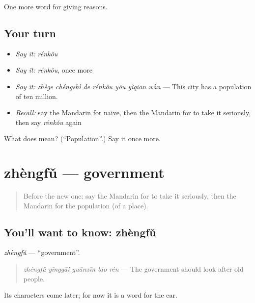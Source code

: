 \begin{grammarlens}[title={What you've built}]
One more word for giving reasons.
\end{grammarlens}

\subsection*{Your turn}
\begin{itemize}
\raggedright
  \item \emph{Say it:} \emph{rénkǒu}
  \item \emph{Say it:} \emph{rénkǒu}, once more
  \item \emph{Say it:} \emph{zhège chéngshì de rénkǒu yǒu yìqiān wàn} — This city has a population of ten million.
  \item \emph{Recall:} say the Mandarin for naive, then the Mandarin for to take it seriously, then say \emph{rénkǒu} again
\end{itemize}

\begin{tcolorbox}[breakable,colback=teal!4,colframe=teal!35!black,title={Before you move on}]
What does  mean? (\textquotedblleft{}Population\textquotedblright{}.) Say it once more.
\end{tcolorbox}
\section[zhèngfǔ]{zhèngfǔ — government}

\label{lesson:ZH-C374-zhengfu}



\begin{quote}
Before the new one: say the Mandarin for to take it seriously, then the Mandarin for the population (of a place).
\end{quote}

\subsection*{You'll want to know: zhèngfǔ}
\emph{zhèngfǔ} — \textquotedblleft{}government\textquotedblright{}.

\begin{quote}
\emph{zhèngfǔ yīnggāi guānxīn lǎo rén} — The government should look after old people.
\end{quote}

Its characters come later; for now it is a word for the ear.

